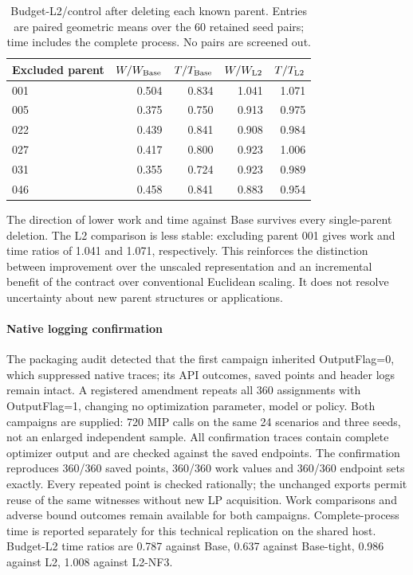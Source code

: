 \begin{table}[htbp]
\centering\small
\caption{Budget-L2/control after deleting each known parent. Entries are paired
geometric means over the 60 retained seed pairs; time includes the complete
process. No pairs are screened out.}
\label{tab:orf-prospective-parent-deletion}
\begin{tabular}{lrrrr}\toprule
Excluded parent & $W/W_{\rm Base}$ & $T/T_{\rm Base}$ & $W/W_{\rm L2}$ & $T/T_{\rm L2}$\\\midrule
001 & 0.504 & 0.834 & 1.041 & 1.071\\
005 & 0.375 & 0.750 & 0.913 & 0.975\\
022 & 0.439 & 0.841 & 0.908 & 0.984\\
027 & 0.417 & 0.800 & 0.923 & 1.006\\
031 & 0.355 & 0.724 & 0.923 & 0.989\\
046 & 0.458 & 0.841 & 0.883 & 0.954\\
\bottomrule\end{tabular}\end{table}
The direction of lower work and time against Base survives every single-parent
deletion. The L2 comparison is less stable: excluding parent 001 gives work
and time ratios of 1.041 and 1.071, respectively. This reinforces the distinction
between improvement over the unscaled representation and an incremental
benefit of the contract over conventional Euclidean scaling. It does not
resolve uncertainty about new parent structures or applications.

\paragraph{Native logging confirmation}
The packaging audit detected that the first campaign inherited OutputFlag=0,
which suppressed native traces; its API outcomes, saved points and header logs
remain intact. A registered amendment repeats all 360 assignments with
OutputFlag=1, changing no optimization parameter, model or policy. Both campaigns
are supplied: 720 MIP calls on the same 24 scenarios and three seeds, not an
enlarged independent sample. All confirmation traces contain complete optimizer
output and are checked against the saved endpoints.
The confirmation reproduces 360/360 saved points,
360/360 work values and 360/360 endpoint sets exactly.
Every repeated point is checked rationally; the unchanged exports permit reuse
of the same witnesses without new LP acquisition. Work comparisons and adverse
bound outcomes remain available for both campaigns. Complete-process time is
reported separately for this technical replication on the shared host.
Budget-L2 time ratios are 0.787 against Base, 0.637 against Base-tight, 0.986 against L2, 1.008 against L2-NF3.
